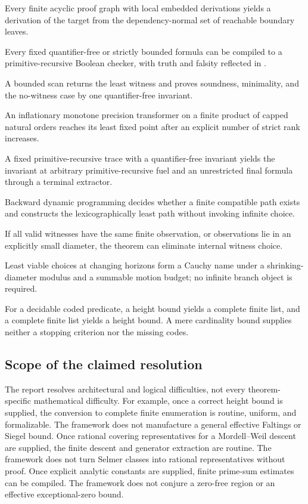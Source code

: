 \begin{description}[style=nextline]
\item[Residual compilation.] Every finite acyclic proof graph with local embedded derivations yields a derivation of the target from the dependency-normal set of reachable boundary leaves.
\item[Fixed bounded reflection.] Every fixed quantifier-free or strictly bounded formula can be compiled to a primitive-recursive Boolean checker, with truth and falsity reflected in \iPRA.
\item[Least bounded search.] A bounded scan returns the least witness and proves soundness, minimality, and the no-witness case by one quantifier-free invariant.
\item[Capped demand closure.] An inflationary monotone precision transformer on a finite product of capped natural orders reaches its least fixed point after an explicit number of strict rank increases.
\item[Finite-trace reflection.] A fixed primitive-recursive trace with a quantifier-free invariant yields the invariant at arbitrary primitive-recursive fuel and an unrestricted final formula through a terminal extractor.
\item[Finite relational viability.] Backward dynamic programming decides whether a finite compatible path exists and constructs the lexicographically least path without invoking infinite choice.
\item[Stable-observable elimination.] If all valid witnesses have the same finite observation, or observations lie in an explicitly small diameter, the theorem can eliminate internal witness choice.
\item[Shrinking finite-horizon coherence.] Least viable choices at changing horizons form a Cauchy name under a shrinking-diameter modulus and a summable motion budget; no infinite branch object is required.
\item[Height/list conversion.] For a decidable coded predicate, a height bound yields a complete finite list, and a complete finite list yields a height bound.  A mere cardinality bound supplies neither a stopping criterion nor the missing codes.
\end{description}

\subsection{Scope of the claimed resolution}

The report resolves architectural and logical difficulties, not every theorem-specific mathematical difficulty.  For example, once a correct height bound is supplied, the conversion to complete finite enumeration is routine, uniform, and formalizable.  The framework does not manufacture a general effective Faltings or Siegel bound.  Once rational covering representatives for a Mordell--Weil descent are supplied, the finite descent and generator extraction are routine.  The framework does not turn Selmer classes into rational representatives without proof.  Once explicit analytic constants are supplied, finite prime-sum estimates can be compiled.  The framework does not conjure a zero-free region or an effective exceptional-zero bound.

